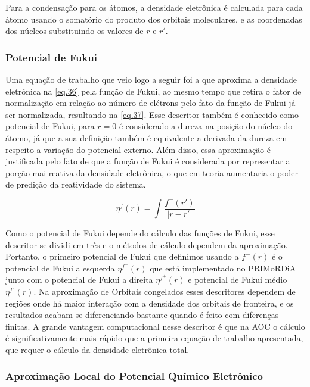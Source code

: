 \documentclass[a4paper,11pt]{refart}
\begin{document}
Para a condensação para os átomos, a densidade eletrônica é calculada para cada átomo usando o somatório do produto dos orbitais moleculares, e as coordenadas dos núcleos substituindo os valores de $r$ e $r'$. 

\subsubsection{Potencial de Fukui}

Uma equação de trabalho que veio logo a seguir foi a que aproxima a densidade eletrônica na \autoref{eq.36} pela função de Fukui, ao mesmo tempo que retira o fator de normalização em relação ao número de elétrons pelo fato da função de Fukui já ser normalizada, resultando na \autoref{eq.37}. Esse descritor também é conhecido como potencial de Fukui, para $r = 0$ é considerado a dureza na posição do núcleo do átomo, já que a sua definição também é equivalente a derivada da dureza em respeito a variação do potencial externo. Além disso, essa aproximação é justificada pelo fato de que a função de Fukui é considerada por representar a porção mai reativa da densidade eletrônica, o que em teoria aumentaria o poder de predição da reatividade do sistema.   

\begin{equation}
\eta^f(r) = \int \frac{f^{-}(r')}{|r - r'|}
\label{eq.37}
\end{equation}

Como o potencial de Fukui depende do cálculo das funções de Fukui, esse descritor se dividi em três e o métodos de cálculo dependem da aproximação. Portanto, o primeiro potencial de Fukui que definimos usando a $f^-(r)$ é o potencial de Fukui a esquerda $\eta^{f^-}(r)$ que está implementado no PRIMoRDiA junto com o potencial de Fukui a direita $\eta^{f^+}(r)$ e potencial de Fukui médio $\eta^{f^0}(r)$. Na aproximação de Orbitais congelados esses descritores dependem de regiões onde há maior interação com a densidade dos orbitais de fronteira, e os resultados acabam se diferenciando bastante quando é feito com diferenças finitas. A grande vantagem computacional nesse descritor é que na AOC o cálculo é significativamente mais rápido que a primeira equação de trabalho apresentada, que requer o cálculo da densidade eletrônica total. 

\subsubsection{Aproximação Local do Potencial Químico Eletrônico}
\end{document}
